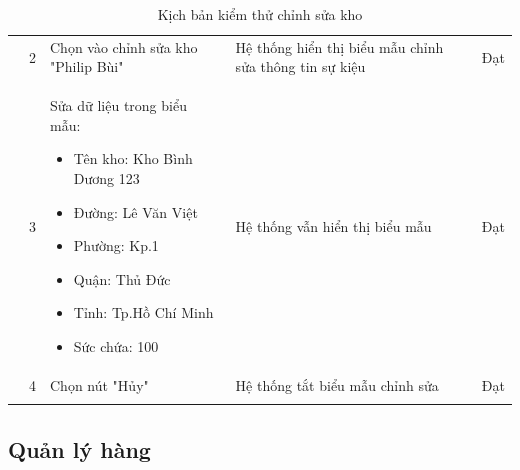 {\begin{longtable}{| p{2.5cm}| p{1cm}| p{5.5cm}| p{4.5cm} | p{1.5cm} |}
        \cline{2-5}
                                              & 2                              & Chọn vào chỉnh sửa kho "Philip Bùi"     & Hệ thống hiển thị biểu mẫu chỉnh sửa thông tin sự kiệu & Đạt             \\
        \cline{2-5}
                                              & 3                              & Sửa dữ liệu trong biểu mẫu:
        \begin{itemize}
            \item Tên kho: Kho Bình Dương 123
            \item Đường: Lê Văn Việt
            \item Phường: Kp.1
            \item Quận: Thủ Đức
            \item Tỉnh: Tp.Hồ Chí Minh
            \item Sức chứa: 100
        \end{itemize}     & Hệ thống vẫn hiển thị biểu mẫu & Đạt                                                                                                                                    \\
        \cline{2-5}
                                              & 4                              & Chọn nút "Hủy"                          & Hệ thống tắt biểu mẫu chỉnh sửa                        & Đạt             \\
        \hline
        \caption{Kịch bản kiểm thử chỉnh sửa kho}
    \end{longtable}
}


\subsection{Quản lý hàng}

